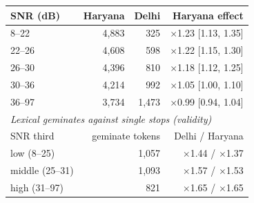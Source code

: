 \begin{tabular}{@{}lrrr@{}}
\toprule
SNR (dB) & Haryana & Delhi & Haryana effect \\
\midrule
8--22 & 4,883 & 325 & $\times$1.23 [1.13, 1.35] \\
22--26 & 4,608 & 598 & $\times$1.22 [1.15, 1.30] \\
26--30 & 4,396 & 810 & $\times$1.18 [1.12, 1.25] \\
30--36 & 4,214 & 992 & $\times$1.05 [1.00, 1.10] \\
36--97 & 3,734 & 1,473 & $\times$0.99 [0.94, 1.04] \\
\midrule
\multicolumn{4}{l}{\textit{Lexical geminates against single stops (validity)}} \\
SNR third & \multicolumn{2}{r}{geminate tokens} & Delhi / Haryana \\
low (8--25) & \multicolumn{2}{r}{1,057} & $\times$1.44 / $\times$1.37 \\
middle (25--31) & \multicolumn{2}{r}{1,093} & $\times$1.57 / $\times$1.53 \\
high (31--97) & \multicolumn{2}{r}{821} & $\times$1.65 / $\times$1.65 \\
\bottomrule
\end{tabular}
